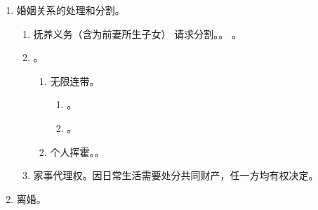 \begin{enumerate}
\begin{enumerate}
\begin{enumerate}
                \end{enumerate}
          \item 法定个人。婚前、确定只归一方的。
                \begin{enumerate}
                  \item 一方婚前财产，除非进行了赠与。。
                  \item 婚前存款、房产生的孳息和自然增值属个人。
                  \item 人身损害赔偿金。
                  \item 继承 \hz 受赠确定只归一方的。
                  \item 夫妻间赠与可以行使任意撤销。
                        。
                \end{enumerate}
          \item 婚前协议有效。。
        \end{enumerate}
  \item 婚姻关系的处理和分割。
        \begin{enumerate}
          \item 抚养义务（含为前妻所生子女） \yjt 请求分割。。
                。
          \item {}。
                \begin{enumerate}
                  \item {} \yjt 无限连带。
                        \begin{enumerate}
                          \item {}。
                          \item {}。
                        \end{enumerate}
                  \item 个人挥霍。。
                \end{enumerate}
          \item 家事代理权。因日常生活需要处分共同财产，任一方均有权决定。
        \end{enumerate}
  \item 离婚。
        \begin{enumerate}

\end{enumerate}
\end{enumerate}

